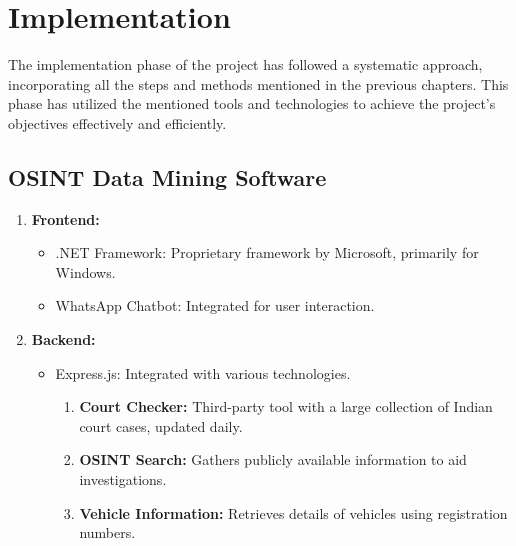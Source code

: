 \chapter{Implementation}\label{ch:implementation}
\justify

The implementation phase of the project has followed a systematic approach, incorporating all the steps and methods mentioned in the previous chapters. This phase has utilized the mentioned tools and technologies to achieve the project's objectives effectively and efficiently.

\section{OSINT Data Mining Software}\label{sec:osint-data-mining-software}
\begin{enumerate}[label=\roman*.]
    \item \textbf{Frontend:}
    \begin{itemize}
        \item .NET Framework: Proprietary framework by Microsoft, primarily for Windows.
        \item WhatsApp Chatbot: Integrated for user interaction.
    \end{itemize}

    \item \textbf{Backend:}
    \begin{itemize}
        \item Express.js: Integrated with various technologies.
        \begin{enumerate}[label=\arabic*.]
            \item \textbf{Court Checker:} Third-party tool with a large collection of Indian court cases, updated daily.
            \item \textbf{OSINT Search:} Gathers publicly available information to aid investigations.
            \item \textbf{Vehicle Information:} Retrieves details of vehicles using registration numbers.
        \end{enumerate}
    \end{itemize}


\end{enumerate}
